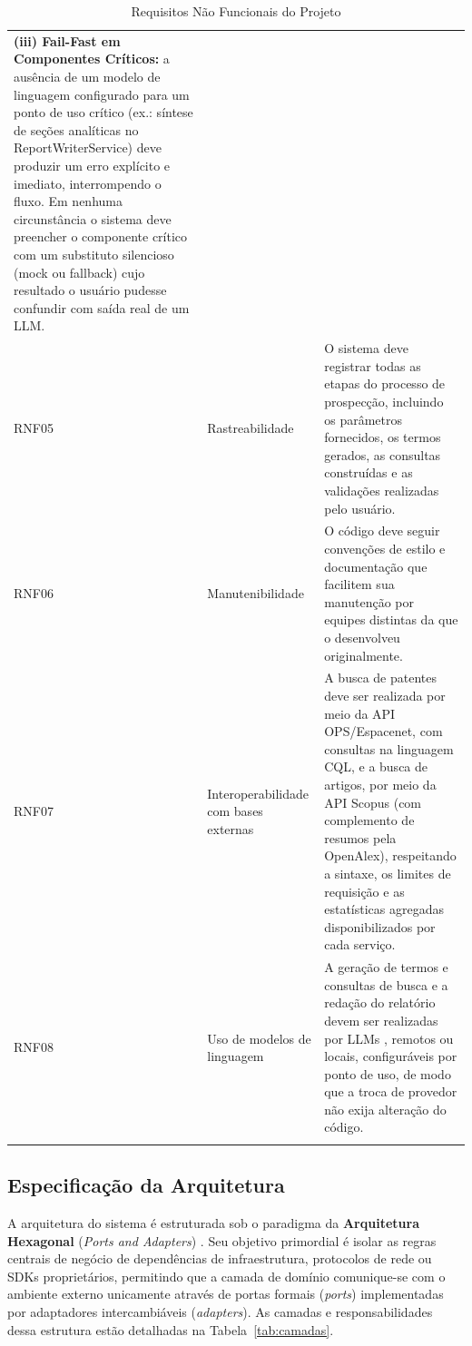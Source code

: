 \documentclass[12pt, a4paper]{article}
\begin{document}
\begin{longtable}{>{\centering\arraybackslash}p{0.8cm}
                  >{\raggedright\arraybackslash}p{3.2cm}
                  >{\raggedright\arraybackslash}p{8.5cm}}
\hspace{0.5cm} \textbf{(iii) Fail-Fast em Componentes Críticos:} a ausência de um modelo de linguagem configurado para um ponto de uso crítico (ex.: síntese de seções analíticas no ReportWriterService) deve produzir um erro explícito e imediato, interrompendo o fluxo. Em nenhuma circunstância o sistema deve preencher o componente crítico com um substituto silencioso (mock ou fallback) cujo resultado o usuário pudesse confundir com saída real de um LLM.
\\[4pt] \addlinespace[8pt]

RNF05 & Rastreabilidade &
O sistema deve registrar todas as etapas do processo de prospecção, incluindo
os parâmetros fornecidos, os termos gerados, as consultas construídas e as
validações realizadas pelo usuário. \\[4pt] \addlinespace[8pt]

RNF06 & Manutenibilidade &
O código deve seguir convenções de estilo e documentação que facilitem sua
manutenção por equipes distintas da que o desenvolveu originalmente. \\[4pt] \addlinespace[8pt]

RNF07 & Interoperabilidade com bases externas &
A busca de patentes deve ser realizada por meio da API OPS/Espacenet, com
consultas na linguagem CQL, e a busca de artigos, por meio da API Scopus
(com complemento de resumos pela OpenAlex), respeitando a sintaxe, os limites
de requisição e as estatísticas agregadas disponibilizados por cada serviço. \\[4pt] \addlinespace[8pt]

RNF08 & Uso de modelos de linguagem &
A geração de termos e consultas de busca e a redação do relatório devem ser
realizadas por LLMs \cite{zhao2023}, remotos ou locais, configuráveis por
ponto de uso, de modo que a troca de provedor não exija alteração do código. \\

\bottomrule
\caption{Requisitos Não Funcionais do Projeto}
\label{tab:rnf}
\end{longtable}
\endgroup

  \subsection{Especificação da Arquitetura}
  \label{sec:hexagonal}

  A arquitetura do sistema é estruturada sob o paradigma da \textbf{Arquitetura Hexagonal} (\textit{Ports and Adapters}) \cite{cockburn2005}. Seu objetivo primordial é isolar as regras centrais de negócio de dependências de infraestrutura, protocolos de rede ou SDKs proprietários, permitindo que a camada de domínio comunique-se com o ambiente externo unicamente através de portas formais (\textit{ports}) implementadas por adaptadores intercambiáveis (\textit{adapters}). As camadas e responsabilidades dessa estrutura estão detalhadas na Tabela~\ref{tab:camadas}.
\end{document}
